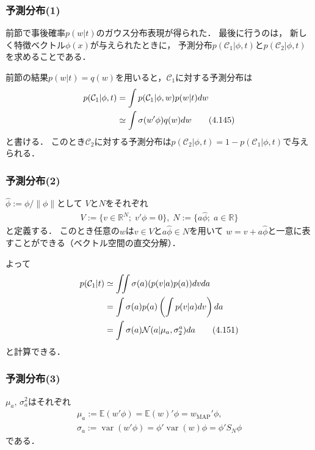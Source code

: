 \documentclass[10pt,usepdftitle=false,hyperref={unicode}]{beamer}
\DeclareMathOperator*{\var}{var}
\begin{document}
\begin{frame}
    \frametitle{予測分布(1)}
    前節で事後確率$p(w|t)$のガウス分布表現が得られた．
    最後に行うのは，
    新しく特徴ベクトル$\phi(x)$が与えられたときに，
    予測分布$p(\mathcal{C}_1|\phi,t)$と$p(\mathcal{C}_2|\phi,t)$を求めることである．

    \bigskip

    前節の結果$p(w|t)=q(w)$を用いると，$\mathcal{C}_1$に対する予測分布は
    \begin{align}
        p(\mathcal{C}_1|\phi,t) &= \int p(\mathcal{C}_1|\phi,w)p(w|t)dw \notag \\
                                &\simeq \int \sigma(w'\phi)q(w)dw \tag{4.145}
    \end{align}
    と書ける．
    このとき$\mathcal{C}_2$に対する予測分布は$p(\mathcal{C}_2|\phi,t) = 1 - p(\mathcal{C}_1|\phi,t)$で与えられる．

\end{frame}

\begin{frame}
    \frametitle{予測分布(2)}
    $\hat{\phi}:=\phi/\|\phi\|$として
    $V$と$N$をそれぞれ
    \begin{gather*}
        V := \{v \in \mathbb{R}^N;\; v'\phi =0 \},\;
        N := \{a\hat{\phi};\;a \in \mathbb{R}\}
    \end{gather*}
    と定義する．
    このとき任意の$w$は$v \in V$と$a\hat{\phi}\in N$を用いて
    $w = v + a\hat{\phi}$と一意に表すことができる（ベクトル空間の直交分解）．

    \bigskip

    よって
    \begin{align}
        p(\mathcal{C}_1|t)
        &\simeq \iint \sigma(a) (p(v|a)p(a))dvda \notag \\
        &= \int \sigma(a)p(a) \left(\int p(v|a) dv\right)da \notag \\
        &= \int \sigma(a)\mathcal{N}(a|\mu_a,\sigma_2^a)da \label{pc1t}
        \tag{4.151}
    \end{align}
    と計算できる．
\end{frame}

\begin{frame}
    \frametitle{予測分布(3)}
    $\mu_a,\,\sigma_a^2$はそれぞれ
    \begin{gather*}
        \mu_a := \mathbb{E}(w'\phi) = \mathbb{E}(w)'\phi = w_\mathrm{MAP}'\phi,\\
        \sigma_a := \var(w'\phi) = \phi'\var(w)\phi = \phi' S_N \phi
    \end{gather*}
    である．

\end{frame}
\end{document}
